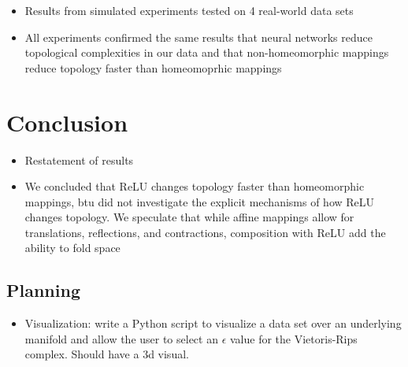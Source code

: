 \documentclass{article}
\begin{document}
\begin{itemize}
	\item Results from simulated experiments tested on 4 real-world data sets
	\item All experiments confirmed the same results that neural networks reduce topological complexities in our data and that non-homeomorphic mappings reduce topology faster than homeomoprhic mappings
\end{itemize}


\section*{Conclusion}

\begin{itemize}
	\item Restatement of results
	\item We concluded that ReLU changes topology faster than homeomorphic mappings, btu did not investigate the explicit mechanisms of how ReLU changes topology. We speculate that while affine mappings allow for translations, reflections, and contractions, composition with ReLU add the ability to fold space
\end{itemize}


\subsection*{Planning}
\begin{itemize}
	\item Visualization: write a Python script to visualize a data set over an underlying manifold and allow the user to select an $\epsilon$ value for the Vietoris-Rips complex. Should have a 3d visual. 
\end{itemize}
\end{document}
